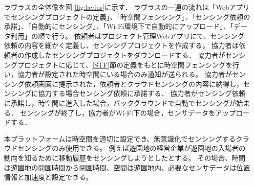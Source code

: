 ラヴラスの全体像を図 \ref{fig:lavlus}に示す．
ラヴラスの一連の流れは「Webアプリでセンシングプロジェクトの定義」、「時空間フェンシング」、「センシング依頼の承諾」、「自動的にセンシング」、「Wi-Fi環境下で自動的にアップロード」、「データ利用」の順で行う。
依頼者はプロジェクト管理Webアプリにて、センシング依頼の内容を細かく定義し、センシングプロジェクトを作成する。
協力者は依頼者の作成したセンシングプロジェクトをダウンロードする．
協力者がセンシングプロジェクトに応じて、\ref{STF}節の定義をもとに時空間フェンシングを行い，協力者が設定された時空間にいる場合のみ通知が送られる。
協力者がセンシング依頼画面に提示された，依頼者とクラウドセンシングの内容に納得し，センシングに協力する場合センシング依頼に承諾する．
協力者がセンシング依頼に承諾し，時空間に進入した場合，バックグラウンドで自動でセンシングが始まる．
センシングが終了し，協力者がWi-Fi下の場合，センサデータをアップロードする．

本プラットフォームは時空間を適切に設定でき、無意識化でセンシングするクラウドセンシングのみ使用できる。
例えば遊園地の経営企業が遊園地の入場者の動向を知るために移動履歴をセンシングしようとしたとする。
その場合、時間は遊園地の開園時間から閉園時間、空間は遊園地内、必要なセンサデータは位置情報と加速度と設定できる。




